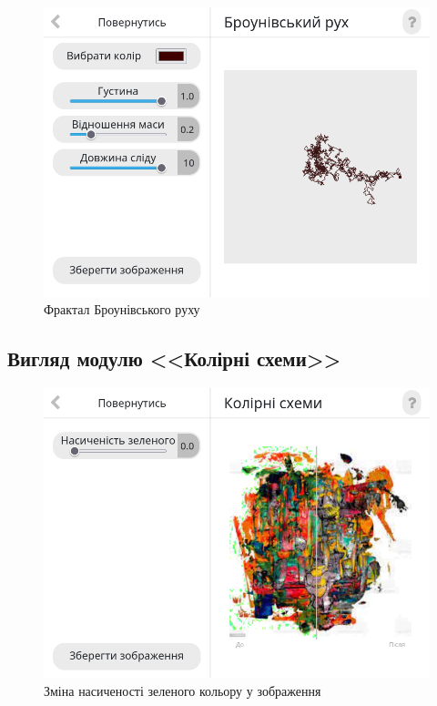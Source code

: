 \documentclass[oneside,14pt]{extarticle}
\begin{document}
\begin{normalsize}
	\begin{figure}[H]
		\centering
		\includegraphics[scale=0.6]{21}
		\caption{Фрактал Броунівського руху}
	\end{figure}
	
	\subsection{Вигляд модулю <<Колірні схеми>>}
	\begin{figure}[H]
		\centering
		\includegraphics[scale=0.6]{31}
		\caption{Зміна насиченості зеленого кольору у зображення}
	\end{figure}
	

\end{normalsize}
\end{document}
